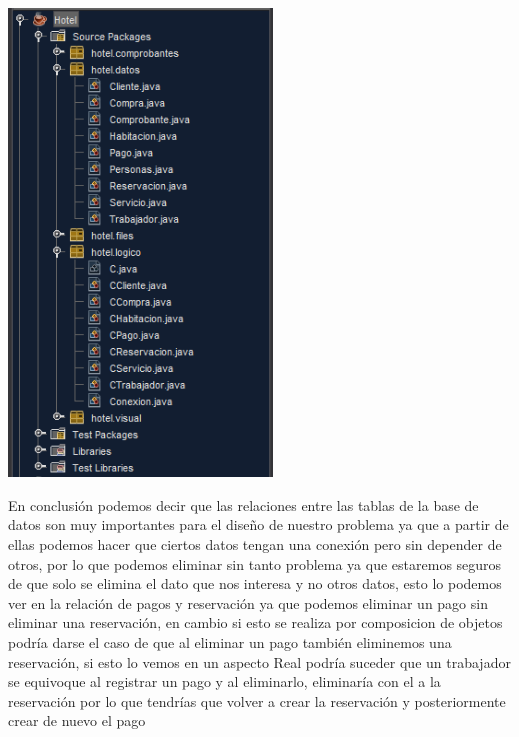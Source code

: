 \documentclass[12pt]{article}
\begin{document}
\begin{flushleft}
\vspace{0.5cm}
\begin{center}
\includegraphics[width=7cm]{diseno2.png}
\end{center}
\vspace{0.5cm}

\textsf{En conclusión podemos decir que las relaciones entre las tablas de la base de datos son muy importantes para el diseño de nuestro problema ya que a partir de ellas podemos hacer que ciertos datos tengan una conexión pero sin depender de otros, por lo que podemos eliminar  sin tanto problema ya que estaremos seguros de que solo se elimina el dato que nos interesa y no otros datos, esto lo podemos ver en la relación de pagos y reservación ya que podemos eliminar un pago sin eliminar una reservación, en cambio si esto se realiza por composicion de objetos podría darse el caso de que al eliminar un pago también eliminemos una reservación,  si esto lo vemos en un aspecto Real podría suceder que un trabajador se equivoque al registrar un pago y al eliminarlo, eliminaría con el a la reservación por lo que tendrías que volver a crear la reservación y posteriormente crear de nuevo el pago}


\end{flushleft}
\end{document}
